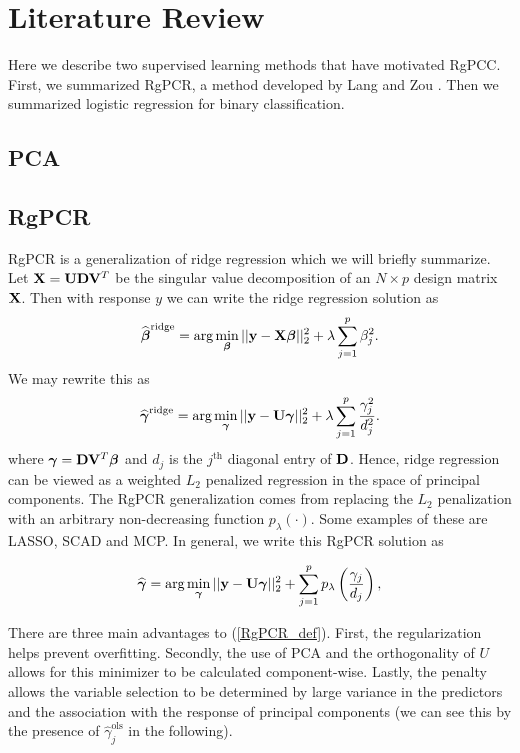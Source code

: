 \documentclass[main.tex]{subfiles}
\begin{document}
\section{Literature Review}
Here we describe two supervised learning methods that have motivated RgPCC. First, we summarized RgPCR, a method developed by Lang and Zou \cite{langzou}.  Then we summarized logistic regression for binary classification.

\subsection{PCA}


\subsection{RgPCR}
RgPCR is a generalization of ridge regression which we will briefly summarize. Let $\mathbf{X} = \mathbf{U} \mathbf{D} \mathbf{V}^T$ be the singular value decomposition of an $N \times p$ design matrix $\mathbf{X}$. Then with response $y$ we can write the ridge regression solution as
\begin{align}
    \widehat{\boldsymbol \beta}^{\text{ridge}} = \text{arg} \min_{\boldsymbol \beta} ||\mathbf{y} - \mathbf{X} \boldsymbol \beta||_2^2 + \lambda \sum_{j = 1}^p \beta_j^2.
\end{align}
We may rewrite this as
\begin{align}
    \widehat{\boldsymbol \gamma}^{\text{ridge}} = \text{arg} \min_{\boldsymbol \gamma} ||\mathbf{y} - \mathbf{U} \boldsymbol \gamma||^2_2 + \lambda \sum_{j = 1}^p \frac{\gamma_j^2}{d_j^2}. \label{RgPCR_ridge}
\end{align}
where $\boldsymbol \gamma = \mathbf{D} \mathbf{V}^T \boldsymbol \beta$ and $d_j$ is the $j^{\text{th}}$ diagonal entry of $\mathbf{D}$. Hence, ridge regression can be viewed as a weighted $L_2$ penalized regression in the space of principal components. The RgPCR generalization comes from replacing the $L_2$ penalization with an arbitrary non-decreasing function $p_{\lambda}(\cdot)$. Some examples of these are LASSO, SCAD and MCP. In general, we write this RgPCR solution as

\begin{align}
    \widehat{\boldsymbol \gamma} = \text{arg} \min_{\boldsymbol \gamma} ||\mathbf{y} - \mathbf{U} \boldsymbol \gamma||^2_2 + \sum_{j = 1}^p p_\lambda \left ( \frac{\gamma_j}{d_j} \right ), \label{RgPCR_def}
\end{align}

There are three main advantages to (\ref{RgPCR_def}). First, the regularization helps prevent overfitting. Secondly, the use of PCA and the orthogonality of $U$ allows for this minimizer to be calculated component-wise. Lastly, the penalty allows the variable selection to be determined by large variance in the predictors and the association with the response of principal components (we can see this by the presence of $\hat{\gamma}^{\text{ols}}_j$ in the following). 
\end{document}

